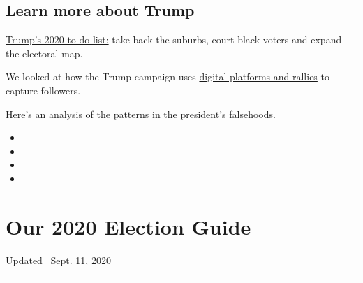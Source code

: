 \hypertarget{learn-more-about-trump}{%
\subsection{Learn more about Trump}\label{learn-more-about-trump}}

\href{https://www.nytimes3xbfgragh.onion/2020/02/08/us/politics/trump-reelection-campaign.html}{Trump's
2020 to-do list:} take back the suburbs, court black voters and expand
the electoral map.

We looked at how the Trump campaign uses
\href{https://www.nytimes3xbfgragh.onion/2020/02/27/us/politics/trump-rally-campaign-data.html}{digital
platforms and rallies} to capture followers.

Here's an analysis of the patterns in
\href{https://www.nytimes3xbfgragh.onion/2018/12/29/us/politics/trump-fact-check.html}{the
president's falsehoods}.

\begin{itemize}
\item
\item
\item
\item
\end{itemize}

\hypertarget{our-2020-election-guide}{%
\section{Our 2020 Election Guide}\label{our-2020-election-guide}}

Updated ~Sept. 11, 2020

\begin{center}\rule{0.5\linewidth}{\linethickness}\end{center}

